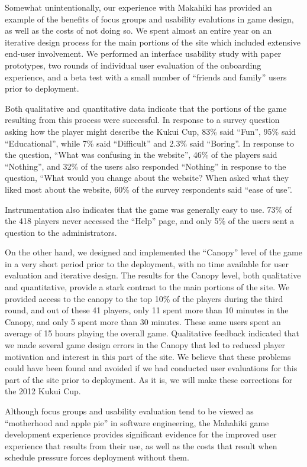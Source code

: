 \documentclass{acm_proc_article-sp}
\begin{document}
Somewhat unintentionally, our experience with Makahiki has provided an
example of the benefits of focus groups and usability evalutions in game
design, as well as the costs of not doing so.  We spent almost an entire
year on an iterative design process for the main portions of the site which
included extensive end-user involvement.  We performed an interface
usability study with paper prototypes, two rounds of individual user
evaluation of the onboarding experience, and a beta test with a small
number of ``friends and family'' users prior to deployment.

Both qualitative and quantitative data indicate that the portions of the
game resulting from this process were successful.  In response to a survey
question asking how the player might describe the Kukui Cup, 83\% said
``Fun'', 95\% said ``Educational'', while 7\% said ``Difficult'' and 2.3\%
said ``Boring''.  In response to the question, ``What was confusing in the
website'', 46\% of the players said ``Nothing'', and 32\% of the users also
responded ``Nothing'' in response to the question, ``What would you change
about the website? When asked what they liked most about the website, 60\%
of the survey respondents said ``ease of use''.

Instrumentation also indicates that the game was generally easy to
use. 73\% of the 418 players never accessed the ``Help'' page, and only 5\%
of the users sent a question to the administrators. 

On the other hand, we designed and implemented the ``Canopy'' level of the
game in a very short period prior to the deployment, with no time available
for user evaluation and iterative design.  The results for the Canopy
level, both qualitative and quantitative, provide a stark contrast to the
main portions of the site.  We provided access to the canopy to the top
10\% of the players during the third round, and out of these 41 players,
only 11 spent more than 10 minutes in the Canopy, and only 5 spent more
than 30 minutes. These same users spent an average of 15 hours playing the
overall game.  Qualitative feedback indicated that we made several game
design errors in the Canopy that led to reduced player motivation and
interest in this part of the site.  We believe that these problems could
have been found and avoided if we had conducted user evaluations for this
part of the site prior to deployment.  As it is, we will make these
corrections for the 2012 Kukui Cup.

Although focus groups and usability evaluation tend to be viewed as
``motherhood and apple pie'' in software engineering, the Mahahiki game
development experience provides significant evidence for the improved user
experience that results from their use, as well as the costs that result
when schedule pressure forces deployment without them.
\end{document}
